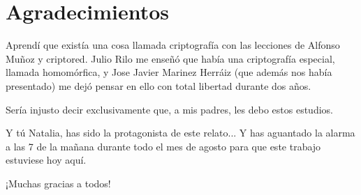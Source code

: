 \chapter*{Agradecimientos}
\label{chap:agradecimientos}

Aprendí que existía una cosa llamada criptografía con las lecciones de Alfonso Muñoz y criptored. Julio Rilo me enseñó que había una criptografía especial, llamada homomórfica, y Jose Javier Marinez Herráiz (que además nos había presentado) me dejó pensar en ello con total libertad durante dos años.

Sería injusto decir exclusivamente que, a mis padres, les debo estos estudios.

Y tú Natalia, has sido la protagonista de este relato... Y has aguantado la alarma a las 7 de la mañana durante todo el mes de agosto para que este trabajo estuviese hoy aquí.

¡Muchas gracias a todos!

